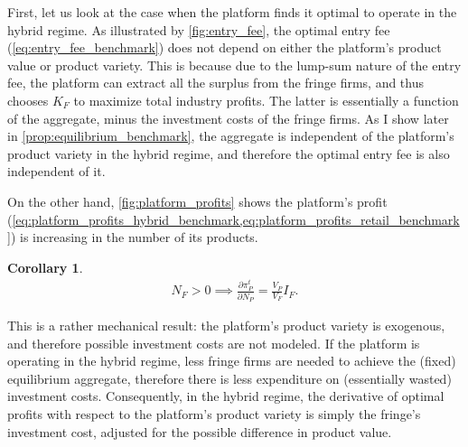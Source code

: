 \documentclass[a4paper]{article}
\newtheorem{corollary}{Corollary}
\begin{document}
First, let us look at the case when the platform finds it optimal to operate in the hybrid regime.
As illustrated by \cref{fig:entry_fee}, the optimal entry fee (\cref{eq:entry_fee_benchmark}) does not depend on either the platform's product value or product variety.
This is because due to the lump-sum nature of the entry fee, the platform can extract all the surplus from the fringe firms, and thus chooses $K_F$ to maximize total industry profits.
The latter is essentially a function of the aggregate, minus the investment costs of the fringe firms.
As I show later in \cref{prop:equilibrium_benchmark}, the aggregate is independent of the platform's product variety in the hybrid regime, and therefore the optimal entry fee is also independent of it.

On the other hand, \cref{fig:platform_profits} shows the platform's profit (\cref{eq:platform_profits_hybrid_benchmark,eq:platform_profits_retail_benchmark}) is increasing in the number of its products.
\begin{corollary}
    \label{prop:platform_profits_comparative_benchmark}
    \begin{align*}
        N_F > 0 \implies \frac{\partial \pi_P^t}{\partial N_P} = \frac{V_P}{V_F} I_F.
    \end{align*}
\end{corollary}
This is a rather mechanical result: the platform's product variety is exogenous, and therefore possible investment costs are not modeled.
If the platform is operating in the hybrid regime, less fringe firms are needed to achieve the (fixed) equilibrium aggregate, therefore there is less expenditure on (essentially wasted) investment costs.
Consequently, in the hybrid regime, the derivative of optimal profits with respect to the platform's product variety is simply the fringe's investment cost, adjusted for the possible difference in product value.
\end{document}
